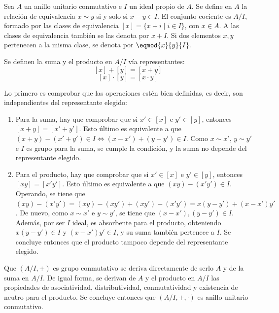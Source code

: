 \begin{deff}{\cite[pp.~25-26]{GamboaAnillos}}
    Sea $A$ un anillo unitario conmutativo e $I$ un ideal propio de $A$. Se define en $A$ la relación de equivalencia $x \sim y$ si y solo si $x - y \in I$. El conjunto cociente es $A/I$, formado por las clases de equivalencia $[x] = \{x + i\mid i\in I\}$, con $x\in A$. A las clases de equivalencia también se las denota por $x + I$. Si dos elementos $x,y$ pertenecen a la misma clase, se denota por $\eqmod{x}{y}{I}$.
    \item Se definen la suma y el producto en $A/I$ vía representantes:
    \[[x] + [y] = [x + y]\]
    \[[x] \cdot [y] = [x \cdot y]\]
\end{deff}

\begin{prop}
\end{prop}
\begin{dem}{\cite[pp.~25-26]{GamboaAnillos}}
    Lo primero es comprobar que las operaciones estén bien definidas, es decir, son independientes del representante elegido: \vspace{-0.5em}
    \begin{enumerate}[label={--}, leftmargin=12pt]
        \item Para la suma, hay que comprobar que si $x'\in [x]$ e $y'\in [y]$, entonces $[x + y] = [x' + y']$. Esto último es equivalente a que $(x + y) - (x' + y') \in I \iff (x-x') + (y-y') \in I$. Como $x \sim x'$, $y \sim y'$ e $I$ es grupo para la suma, se cumple la condición, y la suma no depende del representante elegido.
        \item Para el producto, hay que comprobar que si $x'\in [x]$ e $y'\in [y]$, entonces $[xy] = [x'y']$. Esto último es equivalente a que $(xy) - (x'y') \in I$. Operando, se tiene que $(xy) - (x'y') = (xy) - (xy') + (xy') - (x'y') = x(y-y') + (x-x')y'$. De nuevo, como $x \sim x'$ e $y \sim y'$, se tiene que $(x-x'),(y-y') \in I$. Además, por ser $I$ ideal, es absorbente para el producto, obteniendo $x(y-y')\in I$ y $(x-x')y'\in I$, y su suma también pertenece a $I$. Se concluye entonces que el producto tampoco depende del representante elegido.
    \end{enumerate}
    Que $(A/I, +)$ es grupo conmutativo se deriva directamente de serlo $A$ y de la suma en $A/I$. De igual forma, se derivan de $A$ y el producto en $A/I$ las propiedades de asociatividad, distributividad, conmutatividad y existencia de neutro para el producto. Se concluye entonces que $(A/I, + , \cdot )$ es anillo unitario conmutativo.
\end{dem}

